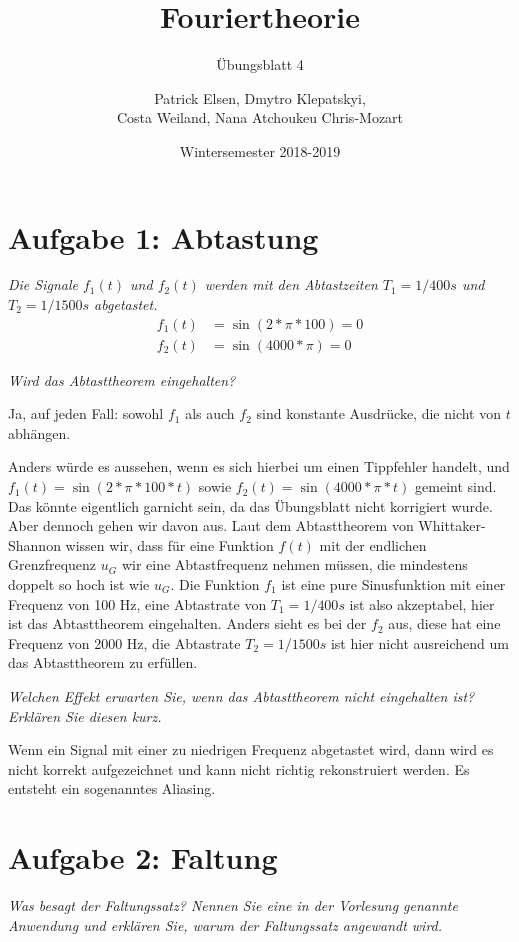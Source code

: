 \documentclass[
  ngerman,
  DIV=14
]{scrartcl}
\title{Fouriertheorie}
\subtitle{Übungsblatt 4}
\author{Patrick Elsen, Dmytro Klepatskyi,\\Costa Weiland, Nana Atchoukeu Chris-Mozart}
\date{Wintersemester 2018-2019}
\begin{document}
\maketitle

\section*{Aufgabe 1: Abtastung}

\emph{Die Signale $f_1(t)$ und $f_2(t)$ werden mit den Abtastzeiten $T_1 = 1/400s$ und $T_2 = 1/1500s$ abgetastet.}
\begin{align*}
f_1(t) &= \sin(2 * \pi * 100) = 0\\
f_2(t) &= \sin(4000 * \pi) = 0 
\end{align*}

\emph{Wird das Abtasttheorem eingehalten?}

Ja, auf jeden Fall: sowohl $f_1$ als auch $f_2$ sind konstante Ausdrücke, die nicht von $t$ abhängen.

Anders würde es aussehen, wenn es sich hierbei um einen Tippfehler handelt, und $f_1(t) = \sin(2 * \pi * 100 * t)$ sowie $f_2(t) = \sin(4000 * \pi * t)$ gemeint sind. Das könnte eigentlich garnicht sein, da das Übungsblatt nicht korrigiert wurde. Aber dennoch gehen wir davon aus. Laut dem Abtasttheorem von Whittaker-Shannon wissen wir, dass für eine Funktion $f(t)$ mit der endlichen Grenzfrequenz $u_G$ wir eine Abtastfrequenz nehmen müssen, die mindestens doppelt so hoch ist wie $u_G$. Die Funktion $f_1$ ist eine pure Sinusfunktion mit einer Frequenz von 100 Hz, eine Abtastrate von $T_1 = 1/400s$ ist also akzeptabel, hier ist das Abtasttheorem eingehalten. Anders sieht es bei der $f_2$ aus, diese hat eine Frequenz von 2000 Hz, die Abtastrate $T_2 = 1/1500s$ ist hier nicht ausreichend um das Abtasttheorem zu erfüllen. 

\emph{Welchen Effekt erwarten Sie, wenn das Abtasttheorem nicht eingehalten ist? Erklären Sie diesen kurz.}

Wenn ein Signal mit einer zu niedrigen Frequenz abgetastet wird, dann wird es nicht korrekt aufgezeichnet und kann nicht richtig rekonstruiert werden. Es entsteht ein sogenanntes Aliasing.

\section*{Aufgabe 2: Faltung}

\emph{Was besagt der Faltungssatz? Nennen Sie eine in der Vorlesung genannte Anwendung und erklären Sie, warum der Faltungssatz angewandt wird.}
\end{document}
